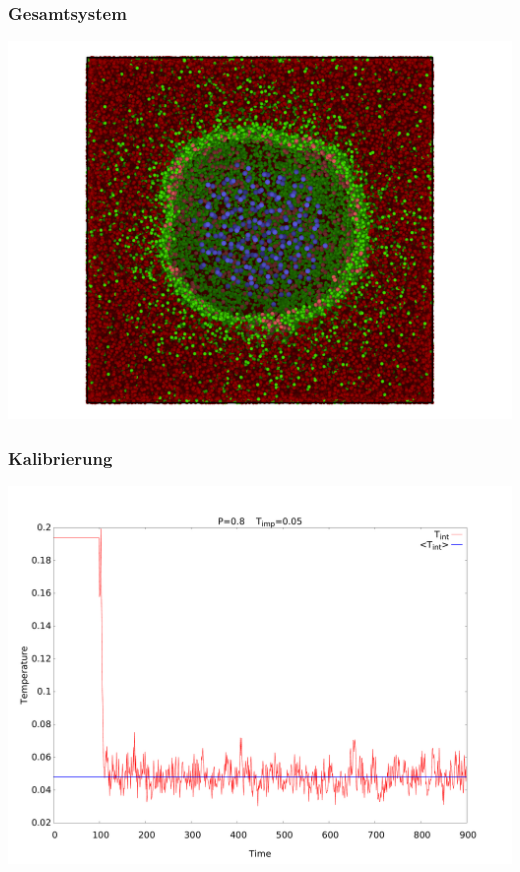 \documentclass[handout]{beamer}
\begin{document}
\begin{frame}
\frametitle{Gesamtsystem}
\begin{center}
\includegraphics[scale=0.2]{../images/baro_170126_large.png}
\end{center}
\end{frame}

\begin{frame}
\frametitle{Kalibrierung}
\begin{center}
\includegraphics[scale=0.2]{../images/t_int.pdf}
\end{center}
\end{frame}
\end{document}
